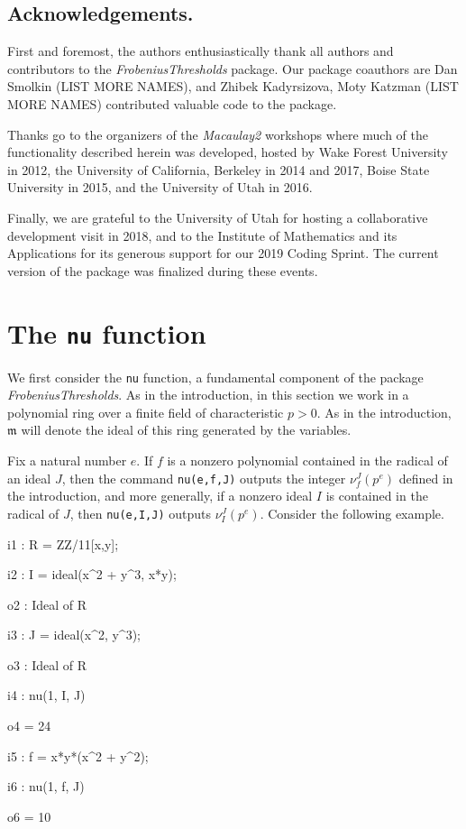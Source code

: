 \documentclass{amsart}
\newcommand{\idealm}{\mathfrak{m}}
\begin{document}
\subsection*{Acknowledgements.}  First and foremost, the authors enthusiastically thank all authors and contributors to the \emph{FrobeniusThresholds} package.
Our package coauthors are Dan Smolkin {\color{red}(LIST MORE NAMES)}, and Zhibek Kadyrsizova, Moty Katzman {\color{red} (LIST MORE NAMES)} contributed valuable code to the package.

Thanks go to the organizers of the \emph{Macaulay2} workshops where much of the functionality described herein was developed, hosted by Wake Forest University in 2012, the University of California, Berkeley in 2014 and 2017, Boise State University in 2015, and the University of Utah in 2016.

Finally, we are grateful to the University of Utah for hosting a collaborative development visit in 2018, and to the Institute of Mathematics and its Applications for its generous support for our 2019 Coding Sprint.
The current version of the package was finalized during these events.

\section{The {\tt nu} function}
\label{sec.Nu}


We first consider the {\tt nu} function, a fundamental component of the package \emph{FrobeniusThresholds}.   As in the introduction, in this section we work in a polynomial ring over a finite field of characteristic $p>0$.  As in the introduction, $\idealm$ will denote the ideal of this ring generated by the variables.

Fix a natural number $e$.  If $f$ is a nonzero polynomial contained in the radical of an ideal $J$, then the command {\tt nu(e,f,J)} outputs the integer $\nu_f^J(p^e)$ defined in the introduction, and
more generally, if a nonzero ideal $I$ is contained in the radical of $J$, then {\tt nu(e,I,J)} outputs $\nu_I^J(p^e)$. Consider the following example.  %

{\small
{}
\begin{MyVerbatim}

i1 : R = ZZ/11[x,y];

i2 : I = ideal(x^2 + y^3, x*y);

o2 : Ideal of R

i3 : J = ideal(x^2, y^3);

o3 : Ideal of R

i4 : nu(1, I, J)

o4 = 24

i5 : f = x*y*(x^2 + y^2);

i6 : nu(1, f, J)

o6 = 10
\end{MyVerbatim}
}
\medspace
\end{document}
